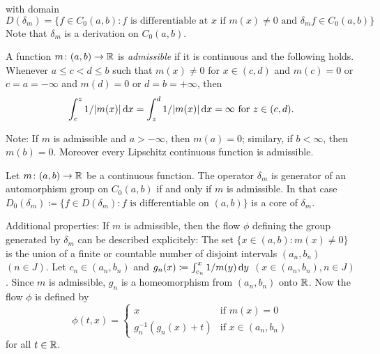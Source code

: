 with domain \\ 
$D(\delta_{m}) = \{ f \in C_{0}(a,b) \colon f \text{ is differentiable at } x \text{ if } m(x) \neq 0 \text{ and } \delta_{m}f \in C_{0}(a,b) \}$ \\
Note that $\delta_{m}$ is a derivation on $C_{0}(a,b)$.
\begin{definition}\label{def:b2-3.16}
%
A function $m \colon (a,b) \to \mathbb{R}$ is \emph{admissible} if it is continuous and the following holds.
Whenever $a \leq c < d \leq b$ such that $m(x) \neq 0$ for $x \in (c,d)$ and $m(c) = 0$ or $c = a = -\infty$ and $m(d) = 0$ or $d = b = +\infty$, then
\begin{equation*}\label{eq:b2-3.16-KGK.1}
\int_{c}^{z} 1/|m(x)| \mathop{}\!\mathrm{d}{x} = \int_{z}^{d} 1/|m(x)| \mathop{}\!\mathrm{d}{x} = \infty \text{ for } z \in (c,d).
\end{equation*}
\end{definition}
Note: If $m$ is admissible and $a > -\infty$, then $m(a) = 0$; similary, if $b < \infty$, then $m(b) = 0$.
Moreover every Lipschitz continuous function is admissible.
\begin{theorem}\label{thm:b2-3.17}
%
Let $m \colon (a,b) \to \mathbb{R}$ be a continuous function.
The operator $\delta_{m}$ is generator of an automorphism group on $C_{0}(a,b)$ if and only if $m$ is admissible.
In that case $D_{0}(\delta_{m}) \coloneqq \{ f \in D(\delta_{m}) \colon f \text{ is differentiable on } (a,b)\}$ is a core of $\delta_{m}$.

\textup{Additional properties:} If $m$ is admissible, then the flow $\phi$ defining the group generated by $\delta_{m}$ can be described explicitely:
The set $\{x \in (a,b) \colon m(x) \neq 0\}$ is the union of a finite or countable number of disjoint intervals $(a_{n},b_{n})$ $(n \in J)$.
Let $c_{n} \in (a_{n},b_{n})$ and $g_{n}(x) \coloneqq \int_{c_{n}}^{x} 1/m(y) \mathop{}\!\mathrm{d}{y}$ $(x \in (a_{n},b_{n}), n \in J)$.
Since $m$ is admissible, $g_{n}$ is a homeomorphism from $(a_{n},b_{n})$ onto $\mathbb{R}$.
Now the flow $\phi$ is defined by
\begin{equation}\label{eq:b2-3.22}
\phi(t,x) = \begin{cases}
    x & \text{if } m(x) = 0 \\
    g_{n}^{-1}(g_{n}(x)+t) & \text{if } x \in (a_{n},b_{n})
\end{cases}
\end{equation}
for all $t \in \mathbb{R}$.
\end{theorem}
